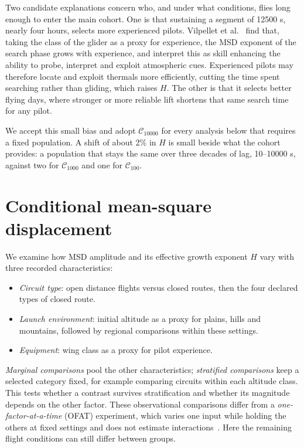 Two candidate explanations concern who, and under what conditions, flies long
enough to enter the main cohort. One is that sustaining a segment of 12500 s,
nearly four hours, selects more experienced pilots. Vilpellet et al.~\cite{vilpellet2026} find that,
taking the class of the glider as a proxy for experience, the MSD exponent of the
search phase grows with experience, and interpret this as skill enhancing the
ability to probe, interpret and exploit atmospheric cues. Experienced pilots may
therefore locate and exploit thermals more efficiently, cutting the time spent
searching rather than gliding, which raises $H$. The other is that it
selects better flying days, where stronger or more reliable lift shortens that same
search time for any pilot.

We accept this small bias and adopt $\mathcal C_{10000}$ for every analysis below that
requires a fixed population. A shift of about 2\% in $H$ is small beside what the cohort
provides: a population that stays the same over three decades of lag, 10--10000 s,
against two for $\mathcal C_{1000}$ and one for $\mathcal C_{100}$.



\section{Conditional mean-square displacement}
\label{sec:fixed-circuit}

We examine how MSD amplitude and its effective growth exponent $H$ vary with
three recorded characteristics:
\begin{itemize}
 \item \emph{Circuit type}: open distance flights versus closed routes, then
 the four declared types of closed route.
 \item \emph{Launch environment}: initial altitude as a proxy for plains,
 hills and mountains, followed by regional comparisons within these settings.
 \item \emph{Equipment}: wing class as a proxy for pilot experience.
\end{itemize}
\emph{Marginal comparisons} pool the other characteristics; \emph{stratified
comparisons} keep a selected category fixed, for example comparing circuits
within each altitude class. This tests whether a contrast survives
stratification and whether its magnitude depends on the other factor.
These observational comparisons differ from a \emph{one-factor-at-a-time}
(OFAT) experiment, which varies one input while holding the others at fixed
settings and does not estimate interactions~\cite{nist_ofat}.
Here the remaining flight conditions can still differ between groups.

